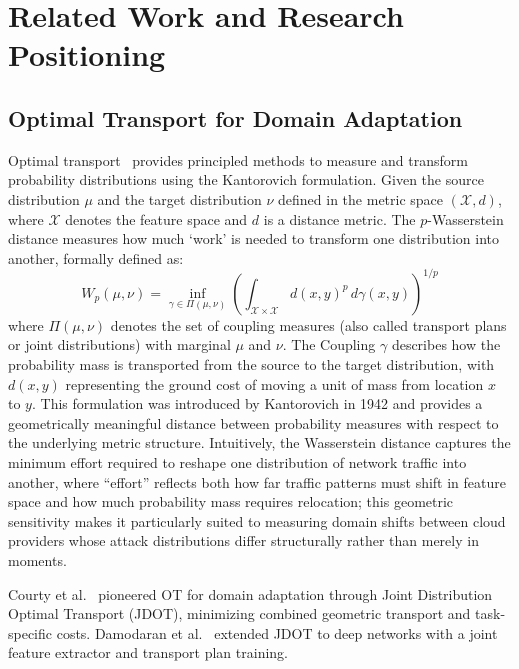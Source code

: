\documentclass{ieeeaccess}
\theoremstyle{plain}
\theoremstyle{definition}
\theoremstyle{remark}
\begin{document}
\section{Related Work and Research Positioning}
\label{sec:related}

\subsection{Optimal Transport for Domain Adaptation}

Optimal transport~\cite{villani2008,kantorovich1942} provides principled methods to measure and transform probability distributions using the Kantorovich formulation. Given the source distribution $\mu$ and the target distribution $\nu$ defined in the metric space $(\mathcal{X}, d)$, where $\mathcal{X}$ denotes the feature space and $d$ is a distance metric. The $p$-Wasserstein distance measures how much `work' is needed to transform one distribution into another, formally defined as:
\begin{equation}
W_p(\mu, \nu) = \inf_{\gamma \in \Pi(\mu,\nu)} \left( \int_{\mathcal{X} \times \mathcal{X}} d(x, y)^p \, d\gamma(x, y) \right)^{1/p}
\end{equation}
where $\Pi(\mu, \nu)$ denotes the set of coupling measures (also called transport plans or joint distributions) with marginal $\mu$ and $\nu$. The Coupling $\gamma$ describes how the probability mass is transported from the source to the target distribution, with $d(x, y)$ representing the ground cost of moving a unit of mass from location $x$ to $y$. This formulation was introduced by Kantorovich in 1942 and provides a geometrically meaningful distance between probability measures with respect to the underlying metric structure. Intuitively, the Wasserstein distance captures the minimum effort required to reshape one distribution of network traffic into another, where ``effort'' reflects both how far traffic patterns must shift in feature space and how much probability mass requires relocation; this geometric sensitivity makes it particularly suited to measuring domain shifts between cloud providers whose attack distributions differ structurally rather than merely in moments.

Courty et al.~\cite{courty2017} pioneered OT for domain adaptation through Joint Distribution Optimal Transport (JDOT), minimizing combined geometric transport and task-specific costs. Damodaran et al.~\cite{damodaran2018} extended JDOT to deep networks with a joint feature extractor and transport plan training.
\end{document}
